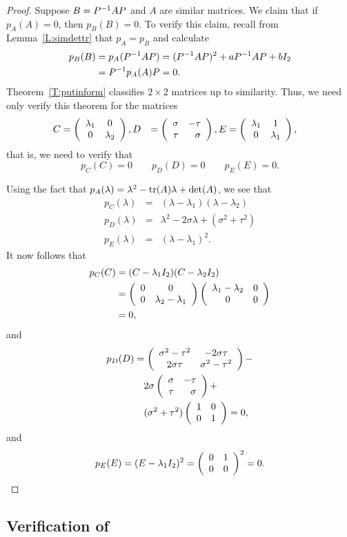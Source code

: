 \documentclass{ximera}
\begin{document}
\begin{proof}  Suppose $B=P^{-1} AP$ and $A$ are similar matrices.  We claim that
if $p_A(A)=0$, then $p_B(B)=0$.  To verify this claim, recall from
Lemma~\ref{L:simdettr} that $p_A=p_B$ and calculate
\begin{align*}
  p_B(B) &= p_A(P^{-1} AP) = (P^{-1} AP)^2 + aP^{-1} AP + bI_2 \\
  &= P^{-1} p_A(A)P= 0.
\end{align*}
Theorem~\ref{T:putinform} classifies $2\times 2$ matrices up to similarity.
Thus, we need only verify this theorem for the matrices
\begin{align*}
C &=  \left(\begin{array}{cc} \lambda_1 & 0\\ 0 &\lambda_2\end{array}\right),
D &=  \left(\begin{array}{rr} \sigma & -\tau\\ \tau &\sigma\end{array}\right),
E &=  \left(\begin{array}{cc} \lambda_1 & 1\\ 0 &\lambda_1\end{array}\right),
\end{align*}
that is, we need to verify that
\[
p_C(C) = 0 \qquad p_D(D)=0 \qquad p_E(E)=0.
\]

Using the fact that $p_A(\lambda)=\lambda^2-{\rm tr}(A)\lambda+\det(A)$, we see
that
\begin{eqnarray*}
p_C(\lambda) & = & (\lambda-\lambda_1)(\lambda-\lambda_2) \\
p_D(\lambda) & = & \lambda^2 - 2\sigma \lambda + (\sigma^2+\tau^2) \\
p_E(\lambda) & = & (\lambda-\lambda_1)^2.
\end{eqnarray*}
It now follows that
\begin{align*}
  p_C(C) &= (C-\lambda_1I_2)(C-\lambda_2I_2) 
           \\
&=\left(\begin{array}{cc} 0 & 0\\ 0 &\lambda_2-\lambda_1\end{array}\right)\left(\begin{array}{cc} \lambda_1-\lambda_2 & 0\\ 0 &0\end{array}\right) \\
&=0,
\end{align*}
and
\begin{align*}
p_D(D) &=
\left(\begin{array}{cc} \sigma^2-\tau^2 & -2\sigma\tau\\ 2\sigma\tau &\sigma^2-\tau^2\end{array}\right) -\\
       &\quad 2\sigma \left(\begin{array}{rr} \sigma & -\tau\\ \tau &\sigma\end{array}\right) + \\
  &\quad (\sigma^2+\tau^2)\left(\begin{array}{rr} 1 & 0\\ 0 &1\end{array}\right) = 0,
\end{align*}
and
\[
p_E(E) = (E-\lambda_1I_2)^2 = \left(\begin{array}{rr} 0 & 1\\ 0 &0\end{array}\right)^2 = 0.
\]
\end{proof}



\subsection*{Verification of \protect{}}
\end{document}
